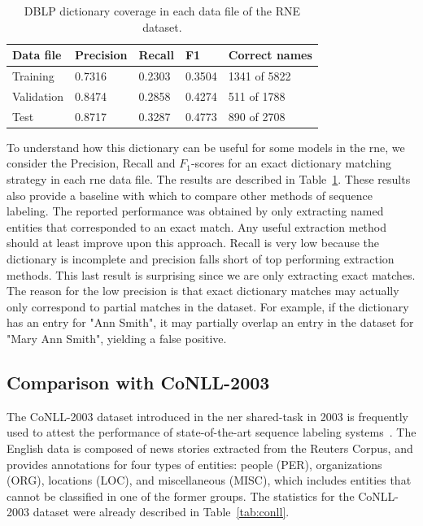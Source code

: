 \documentclass{nle}
\begin{document}
\begin{table}[h]
  \small
  \begin{center}
    \begin{tabular}{ lllll }
      \toprule
      Data file & Precision & Recall & F1 & Correct names \\
      \midrule
      Training   & 0.7316 & 0.2303 & 0.3504 & 1341 of 5822 \\ 
      Validation & 0.8474 & 0.2858 & 0.4274 & 511 of 1788 \\ 
      Test       & 0.8717 & 0.3287 & 0.4773 & 890 of 2708 \\ 
      \bottomrule
    \end{tabular}
  \end{center}
  \caption{DBLP dictionary coverage in each data file of the RNE dataset.}
  \label{tab:gazetteer}
\end{table}

To understand how this dictionary can be useful for some models in the \gls{rne}, 
we consider the Precision, Recall and $ F_1 $-scores for an exact dictionary matching 
strategy in each \gls{rne} data file. The results are described in 
Table~\ref{tab:gazetteer}. These results also provide a baseline with which to compare
other methods of sequence labeling. 
The reported performance was obtained by only extracting named entities that corresponded to an exact 
match. Any useful extraction method should at least improve upon this approach.
Recall is very low because the dictionary is incomplete and precision falls short of
top performing extraction methods. This last result is surprising since we are only extracting 
exact matches. The reason for the low precision is that exact dictionary matches may actually 
only correspond to partial matches in the dataset. For example, if the dictionary has an entry
for "Ann Smith", it may partially overlap an entry in the dataset for "Mary Ann Smith", yielding
a false positive.


\subsection{Comparison with {CoNLL-2003}}
\label{sec:conll_comparison}

The {CoNLL-2003} dataset introduced in the \gls{ner}
shared-task in 2003 is frequently used to attest 
the performance of state-of-the-art sequence labeling systems~\cite{Huang2015,Lample2016,Ma2016,Peters2018}. 
The English data is composed of news stories extracted from the Reuters Corpus, and 
provides annotations for four types of entities: people (PER), organizations (ORG), 
locations (LOC), and miscellaneous (MISC), which includes entities that cannot be 
classified in one of the former groups. The statistics for the {CoNLL-2003} dataset 
were already described in Table~\ref{tab:conll}.
\end{document}
